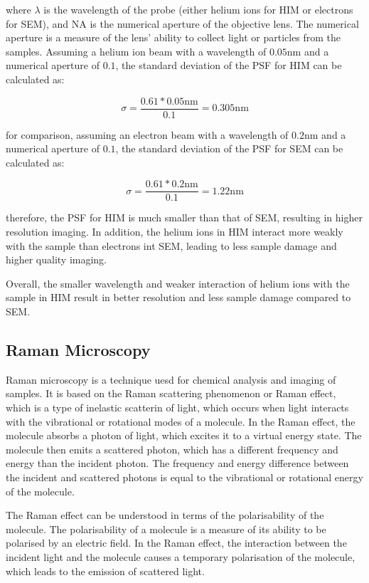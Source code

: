 where $\lambda$ is the wavelength of the probe (either helium ions for HIM or electrons for SEM), and NA is the numerical aperture of the objective lens. The numerical aperture is a measure of the lens' ability to collect light or particles from the samples. Assuming a helium ion beam with a wavelength of $0.05\si{\nano\metre}$ and a numerical aperture of $0.1$, the standard deviation of the PSF for HIM can be calculated as:

\begin{equation}
    \sigma = \frac{0.61*0.05 \si{\nano\metre}}{0.1} = 0.305 \si{\nano\metre}
    \label{eq:PSF_HIM_standard_deviation}
\end{equation}

for comparison, assuming an electron beam with a wavelength of $0.2\si{\nano\metre}$ and a numerical aperture of $0.1$, the standard deviation of the PSF for SEM can be calculated as:

\begin{equation}
    \sigma = \frac{0.61*0.2\si{\nano\metre}}{0.1} = 1.22 \si{\nano\metre}
    \label{eq:PSF_SEM_standard_deviation}
\end{equation}

therefore, the PSF for HIM is much smaller than that of SEM, resulting in higher resolution imaging. In addition, the helium ions in HIM interact more weakly with the sample than electrons int SEM, leading to less sample damage and higher quality imaging.

Overall, the smaller wavelength and weaker interaction of helium ions with the sample in HIM result in better resolution and less sample damage compared to SEM.
\subsection{Raman Microscopy}
Raman microscopy is a technique uesd for chemical analysis and imaging of samples. It is based on the Raman scattering phenomenon or Raman effect, which is a type of inelastic scatterin of light, which occurs when light interacts with the vibrational or rotational modes of a molecule. In the Raman effect, the molecule absorbs a photon of light, which excites it to a virtual energy state. The molecule then emits a scattered photon, which has a different frequency and energy than the incident photon. The frequency and energy difference between the incident and scattered photons is equal to the vibrational or rotational energy of the molecule. 

The Raman effect can be understood in terms of the polarisability of the molecule. The polarisability of a molecule is a measure of its ability to be polarised by an electric field. In the Raman effect, the interaction between the incident light and the molecule causes a temporary polarisation of the molecule, which leads to the emission of scattered light.


